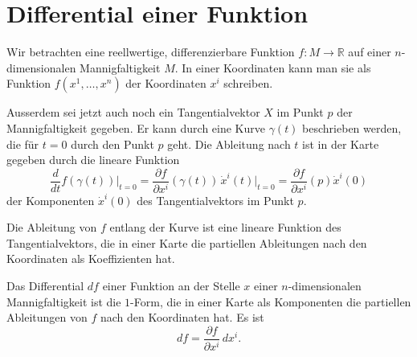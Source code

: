 %
%
\section{Differential einer Funktion}
%
Wir betrachten eine reellwertige, differenzierbare Funktion
$f\colon M\to\mathbb{R}$ auf einer $n$-di\-men\-sio\-na\-len 
Mannigfaltigkeit $M$.
In einer Koordinaten kann man sie als Funktion 
$f(x^1,\dots,x^n)$ der Koordinaten $x^i$ schreiben.

Ausserdem sei jetzt auch noch ein Tangentialvektor $X$ im Punkt
$p$ der Mannigfaltigkeit gegeben.
Er kann durch eine Kurve $\gamma(t)$ beschrieben werden, die
für $t=0$ durch den Punkt $p$ geht.
Die Ableitung nach $t$ ist in der Karte gegeben durch die
lineare Funktion
\[
\frac{d}{dt}
f(\gamma(t))
\bigg|_{t=0}
=
\frac{\partial f}{\partial x^i}(\gamma(t))\,\dot{x}^i(t)\bigg|_{t=0}
=
\frac{\partial f}{\partial x^i}(p)\dot{x}^i(0)
\]
der Komponenten $\dot{x}^i(0)$ des Tangentialvektors im Punkt $p$.

Die Ableitung von $f$ entlang der Kurve ist eine lineare 
Funktion des Tangentialvektors, die in einer Karte die
partiellen Ableitungen nach den Koordinaten als Koeffizienten
hat.

\begin{definition}
\label{buch:kurvenintegral:differential:def:differential}
%
Das Differential $df$ einer Funktion an der Stelle $x$ einer
$n$-dimensionalen Mannigfaltigkeit ist die $1$-Form, die in einer
Karte als Komponenten die partiellen Ableitungen von $f$ nach den
Koordinaten hat.
Es ist
\[
df
=
\frac{\partial f}{\partial x^i}\,dx^i.
\]
\end{definition}

%
%
